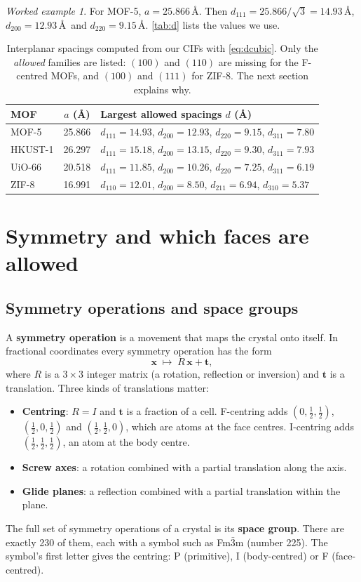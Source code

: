 \documentclass[11pt,a4paper]{article}
\theoremstyle{remark}\newtheorem*{example}{Worked example}
\newcommand{\vect}[1]{\mathbf{#1}}
\begin{document}
\begin{example}
For MOF-5, $a=25.866$\,\AA. Then $d_{111}=25.866/\sqrt3=14.93$\,\AA, $d_{200}=12.93$\,\AA\ and $d_{220}=9.15$\,\AA. \autoref{tab:d} lists the values we use.
\end{example}

\begin{table}[H]\centering\small
\begin{tabular}{lcl}
\toprule
MOF & $a$ (\AA) & Largest allowed spacings $d$ (\AA) \\
\midrule
MOF-5 & 25.866 & $d_{111}=14.93$, $d_{200}=12.93$, $d_{220}=9.15$, $d_{311}=7.80$\\
HKUST-1 & 26.297 & $d_{111}=15.18$, $d_{200}=13.15$, $d_{220}=9.30$, $d_{311}=7.93$\\
UiO-66 & 20.518 & $d_{111}=11.85$, $d_{200}=10.26$, $d_{220}=7.25$, $d_{311}=6.19$\\
ZIF-8 & 16.991 & $d_{110}=12.01$, $d_{200}=8.50$, $d_{211}=6.94$, $d_{310}=5.37$\\
\bottomrule
\end{tabular}
\caption{Interplanar spacings computed from our CIFs with \eqref{eq:dcubic}. Only the \emph{allowed} families are listed: $(100)$ and $(110)$ are missing for the F-centred MOFs, and $(100)$ and $(111)$ for ZIF-8. The next section explains why.}
\label{tab:d}
\end{table}

\section{Symmetry and which faces are allowed}\label{sec:symmetry}

\subsection{Symmetry operations and space groups}
A \textbf{symmetry operation} is a movement that maps the crystal onto itself. In fractional coordinates every symmetry operation has the form
\begin{equation}
\vect{x}\;\mapsto\;R\,\vect{x}+\vect{t},
\end{equation}
where $R$ is a $3\times3$ integer matrix (a rotation, reflection or inversion) and $\vect{t}$ is a translation. Three kinds of translations matter:
\begin{itemize}
\item \textbf{Centring}: $R=I$ and $\vect{t}$ is a fraction of a cell. F-centring adds $(0,\tfrac12,\tfrac12)$, $(\tfrac12,0,\tfrac12)$ and $(\tfrac12,\tfrac12,0)$, which are atoms at the face centres. I-centring adds $(\tfrac12,\tfrac12,\tfrac12)$, an atom at the body centre.
\item \textbf{Screw axes}: a rotation combined with a partial translation along the axis.
\item \textbf{Glide planes}: a reflection combined with a partial translation within the plane.
\end{itemize}
The full set of symmetry operations of a crystal is its \textbf{space group}. There are exactly 230 of them, each with a symbol such as Fm$\bar3$m (number 225). The symbol's first letter gives the centring: P (primitive), I (body-centred) or F (face-centred).
\end{document}
